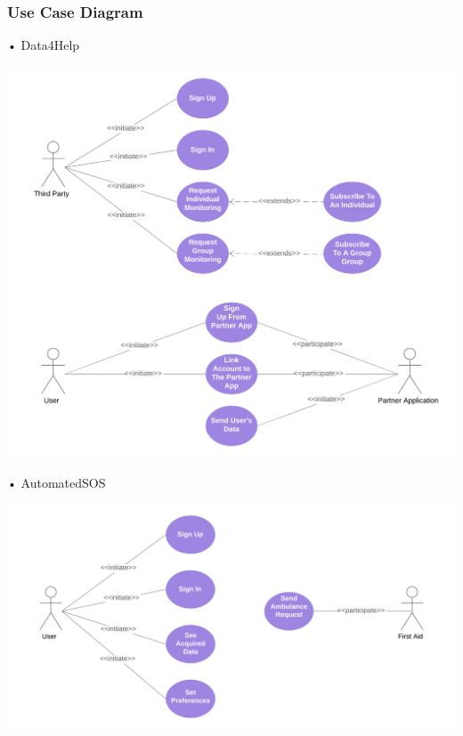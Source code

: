 \subsubsection{Use Case Diagram}
\begin{enumerate}
\begin{minipage}{\textwidth}
\FloatBarrier
\item[•]{\Large Data4Help}
\\[2cm]
\begin{center}
\includegraphics[scale=0.65]{Images/UseCaseDiagrams/Data4HelpUseCaseDiagram.png}
\end{center}
\FloatBarrier
\end{minipage}
\clearpage


\begin{minipage}{\textwidth}
\item[•]{\Large AutomatedSOS}
\FloatBarrier
\begin{center}
\includegraphics[scale=0.65]{Images/UseCaseDiagrams/AutomatedSOSCaseDiagram.png}
\end{center}
\FloatBarrier
\end{minipage}


\end{enumerate}
